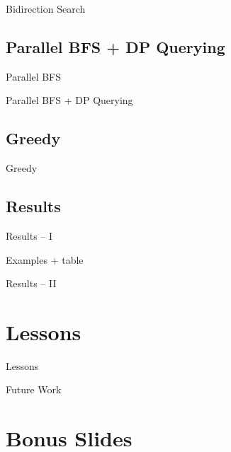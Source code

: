 \documentclass[t,10pt,
mathserif,xcolor=dvipsnames]{beamer}
\begin{document}
\begin{myframe}{Bidirection Search}

\end{myframe}

\subsection{Parallel BFS + DP Querying}

\begin{myframe}{Parallel BFS}

\end{myframe}

\begin{myframe}{Parallel BFS + DP Querying}

\end{myframe}

\subsection{Greedy}

\begin{myframe}{Greedy}

\end{myframe}

\subsection{Results}

\begin{myframe}{Results -- I}

  Examples + table
  
\end{myframe}

\begin{myframe}{Results -- II}

\end{myframe}

\section{Lessons}


\begin{myframe}{Lessons}
 
\end{myframe}

\begin{myframe}{Future Work}

\end{myframe}


\section{Bonus Slides}
 
\end{document}
